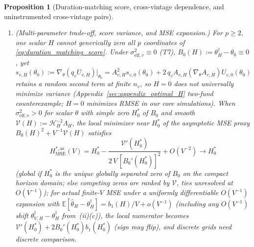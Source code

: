 \documentclass[12pt]{article}
\newtheorem{proposition}{Proposition}
\begin{document}
\begin{proposition}[Duration-matching score, cross-vintage dependence, and uninstrumented cross-vintage pairs]
\begin{enumerate}
  \item[\textbf{(iii)}] \emph{(Multi-parameter trade-off, score variance, and MSE expansion.)}
  For $p \ge 2$, one scalar $H$ cannot generically zero all $p$ coordinates of \eqref{eq:duration_matching_score}. Under $\sigma_{\mathrm{eff},v}^2 \equiv 0$ (T7), $B_0(H) := \theta_H^\dagger - \theta_0 \equiv 0$, yet $s_{v,H}(\theta_0) := \nabla_\theta(q_v U_{v,H})|_{\theta_0} = A_{v,H}^2 s_{v,0}(\theta_0) + 2\,q_v A_{v,H}(\nabla_\theta A_{v,H})U_{v,0}(\theta_0)$ retains a random second term at finite $n_v$, so $H=0$ does not universally minimize variance (Appendix~\ref{sec:appendix_optimal_H} two-fund counterexample; $H=0$ minimizes RMSE in our core simulations). When $\sigma_{\mathrm{eff},v}^2 > 0$ for scalar $\theta$ with simple zero $H_0^\ast$ of $B_0$ and smooth $\mathcal{V}(H) := \mathcal{H}_H^{-2}\Lambda_H$, the \emph{local} minimizer near $H_0^\ast$ of the asymptotic MSE proxy $B_0(H)^2 + V^{-1}\mathcal{V}(H)$ satisfies
  \begin{equation}
  \label{eq:H_mse_expansion}
  H_{\mathrm{MSE}}^{\ast,\mathrm{as}}(V) = H_0^\ast - \frac{\mathcal{V}'(H_0^\ast)}{2\,V\,[B_0'(H_0^\ast)]^2} + O(V^{-2}) \to H_0^\ast
  \end{equation}
  (global if $H_0^\ast$ is the unique globally separated zero of $B_0$ on the compact horizon domain; else competing zeros are ranked by $\mathcal{V}$, ties unresolved at $O(V^{-1})$); for actual finite-$V$ MSE under a uniformly differentiable $O(V^{-1})$ expansion with $\mathbb{E}[\hat\theta_H - \theta_H^\dagger] = b_1(H)/V + o(V^{-1})$ (including any $O(V^{-1})$ shift $\theta_{V,H}^\dagger - \theta_H^\dagger$ from~(ii)(c)), the local numerator becomes $\mathcal{V}'(H_0^\ast) + 2B_0'(H_0^\ast)b_1(H_0^\ast)$ (sign may flip), and discrete grids need discrete comparison.


\end{enumerate}
\end{proposition}
\end{document}
